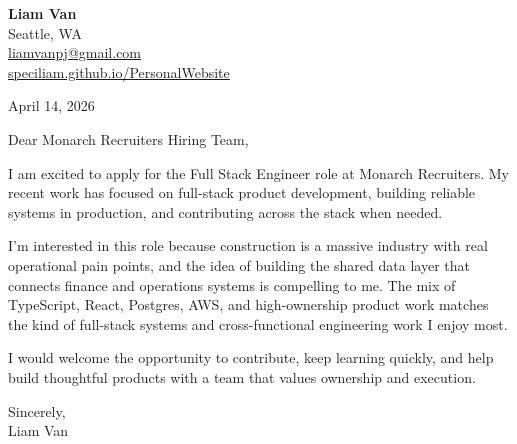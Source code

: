\documentclass[letterpaper,11pt]{article}
\begin{document}
\begin{flushleft}
\textbf{\Large Liam Van} \\
Seattle, WA \\
\href{mailto:liamvanpj@gmail.com}{liamvanpj@gmail.com} \\
\href{https://speciliam.github.io/PersonalWebsite}{speciliam.github.io/PersonalWebsite}
\end{flushleft}

April 14, 2026

\noindent Dear Monarch Recruiters Hiring Team,

\noindent I am excited to apply for the Full Stack Engineer role at Monarch Recruiters. My recent work has focused on full-stack product development, building reliable systems in production, and contributing across the stack when needed.

\noindent I'm interested in this role because construction is a massive industry with real operational pain points, and the idea of building the shared data layer that connects finance and operations systems is compelling to me. The mix of TypeScript, React, Postgres, AWS, and high-ownership product work matches the kind of full-stack systems and cross-functional engineering work I enjoy most.

\noindent I would welcome the opportunity to contribute, keep learning quickly, and help build thoughtful products with a team that values ownership and execution.

\noindent Sincerely, \\
Liam Van
\end{document}
